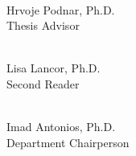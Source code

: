 \documentclass[12pt]{report}
\begin{document}
\begin{flushright}

\vspace{0.5in}

\makebox[2in]{\hrulefill} \\
Hrvoje Podnar, Ph.D. \\
Thesis Advisor

\vspace{0.5in}

\makebox[2in]{\hrulefill} \\
Lisa Lancor, Ph.D. \\
Second Reader

\end{flushright}

\vspace{0.25in}

\begin{flushleft}
\makebox[2in]{\hrulefill} \\
Imad Antonios, Ph.D. \\
Department Chairperson
\end{flushleft}
\end{document}
